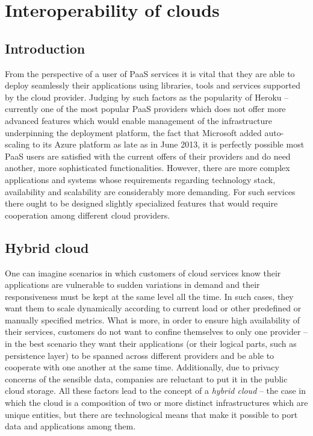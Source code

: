 \newpage
\section{Interoperability of clouds}

\subsection{Introduction}
From the perspective of a user of PaaS services it is vital that they are able to deploy seamlessly their applications using libraries, tools and services supported by the cloud provider\cite{MeGr11}. Judging by such factors as the popularity of Heroku -- currently one of the most popular PaaS providers which does not offer more advanced features which would enable management of the infrastructure underpinning the deployment platform, the fact that Microsoft added auto-scaling to its Azure platform as late as in June 2013, it is perfectly possible most PaaS users are satisfied with the current offers of their providers and do need another, more sophisticated functionalities. However, there are more complex applications and systems whose requirements regarding technology stack, availability and scalability are considerably more demanding. For such services there ought to be designed slightly specialized features that would require cooperation among different cloud providers.

\subsection{Hybrid cloud}
One can imagine scenarios in which customers of cloud services know their applications are vulnerable to sudden variations in demand and their responsiveness must be kept at the same level all the time. In such cases, they want them to scale dynamically according to current load or other predefined or manually specified metrics. What is more, in order to ensure high availability of their services, customers do not want to confine themselves to only one provider -- in the best scenario they want their applications (or their logical parts, such as persistence layer) to be spanned across different providers and be able to cooperate with one another at the same time. Additionally, due to privacy concerns of the sensible data, companies are reluctant to put it in the public cloud storage. All these factors lead to the concept of a \emph{hybrid cloud}\cite{MeGr11} -- the case in which the cloud is a composition of two or more distinct infrastructures which are unique entities, but there are technological means that make it possible to port data and applications among them.

